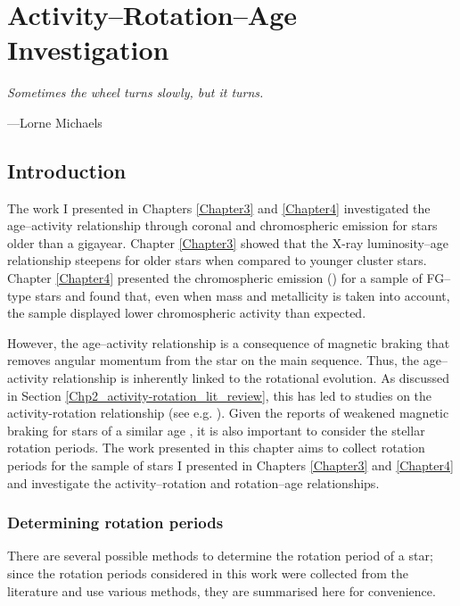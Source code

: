 
\chapter{Activity--Rotation--Age Investigation} %

\label{Chapter5} 

\epigraph{\itshape Sometimes the wheel turns slowly, but it turns.}{---Lorne Michaels}

\section{Introduction}

The work I presented in Chapters \ref{Chapter3} and \ref{Chapter4} investigated the age--activity relationship through coronal and chromospheric emission for stars older than a gigayear. Chapter \ref{Chapter3} \citep{Booth_etal_2017} showed that the X-ray luminosity--age relationship steepens for older stars when compared to younger cluster stars. Chapter \ref{Chapter4} presented the chromospheric emission (\Rprime) for a sample of FG--type stars and found that, even when mass and metallicity is taken into account, the sample displayed lower chromospheric activity than expected.

However, the age--activity relationship is a consequence of magnetic braking that removes angular momentum from the star on the main sequence. Thus, the age--activity relationship is inherently linked to the rotational evolution. As discussed in Section \ref{Chp2_activity-rotation_lit_review}, this has led to studies on the activity-rotation relationship (see e.g. \citealt{Pizzolato_etal_2003,Wright_etal_2011}). Given the reports of weakened magnetic braking for stars of a similar age \citep{van_Saders_etal_2016}, it is also important to consider the stellar rotation periods. The work presented in this chapter aims to collect rotation periods for the sample of stars I presented in Chapters \ref{Chapter3} and \ref{Chapter4} and investigate the activity--rotation and rotation--age relationships.

\subsection{Determining rotation periods}
\label{Chp5_Prot_methods}

There are several possible methods to determine the rotation period of a star; since the rotation periods considered in this work were collected from the literature and use various methods, they are summarised here for convenience.

